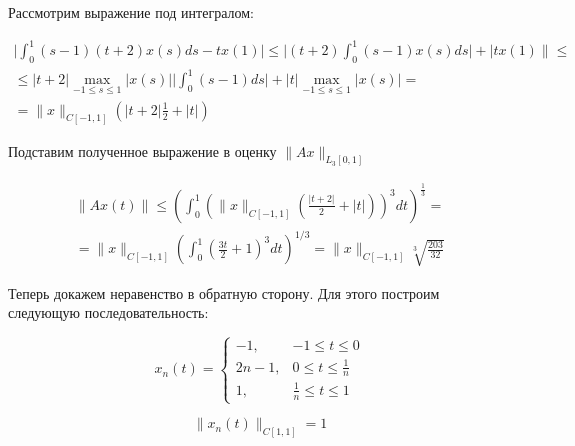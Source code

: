 \documentclass[12pt, a4paper]{report}
\begin{document}
Рассмотрим выражение под интегралом:

\begin{multline*}
    \Big| \int_{0}^{1} (s-1)(t+2)x(s)ds - tx(1) \Big| \le
    \Big| (t+2) \int_{0}^{1} (s-1) x(s) ds \Big| + \Big| t x(1) \| \le\\ \le
    |t+2| \max_{-1 \le s \le 1} |x(s)| \Big| \int_{0}^{1} (s-1) ds \Big| +
    |t| \max_{-1 \le s \le 1} |x(s)| = \\ =
    \| x\|_{C[-1, 1]} \left( |t+2| \frac{1}{2} + |t| \right)  
\end{multline*}

Подставим полученное выражение в оценку $\| Ax\|_{L_3[0, 1]}$

\begin{multline*}
    \| Ax(t) \| \le \left( \int_{0}^{1} \left( \| x \|_{C[-1, 1]}
    \left( \frac{|t+2|}{2} + |t|  \right) \right)^3  dt\right)^{\frac{1}{3}} =\\ =
    \| x \|_{C[-1, 1]} \left( \int_{0}^{1} \left( \frac{3t}{2} +1 \right)^3 dt \right)^{1/3} =
    \| x \|_{C[-1, 1]} \sqrt[3]{\frac{203}{32}}
\end{multline*}

Теперь докажем неравенство в обратную сторону. Для этого построим следующую последовательность:

\begin{equation*}
    x_n(t) = 
    \begin{cases}
        -1,      & -1 \le t \le 0\\
        2n-1,    & 0 \le t \le \frac{1}{n}\\
        1,       & \frac{1}{n} \le t \le 1
    \end{cases}
\end{equation*}

\[
  \|x_n(t)\|_{C[1, 1]} = 1  
\]


\end{document}
